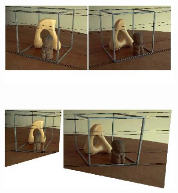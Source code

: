 \begin{figure}

  \begin{subfigure}[b]{0.48\textwidth}
    \centering
    \includegraphics[width=\textwidth]{images/rectification-example.png}
    \caption{}
  \end{subfigure}
  ~
  \begin{subfigure}[b]{0.48\textwidth}
    \centering
    \includegraphics[width=\textwidth]{images/rectification-example-2.png}
    \caption{}
  \end{subfigure}


\end{figure}
